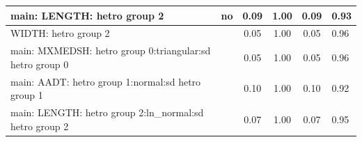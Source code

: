 \begin{table}
\begin{center}
\begin{tabular}{|l|l|c|c|c|l|}
			\hline
			main: LENGTH: hetro group 2 & no & 0.09 & 1.00 & 0.09 & 0.93 \\
			\hline
			WIDTH: hetro group 2 &  & 0.05 & 1.00 & 0.05 & 0.96 \\
			\hline
			main: MXMEDSH: hetro group 0:triangular:sd  hetro group 0 &  & 0.05 & 1.00 & 0.05 & 0.96 \\
			\hline
			main: AADT: hetro group 1:normal:sd  hetro group 1 &  & 0.10 & 1.00 & 0.10 & 0.92 \\
			\hline
			main: LENGTH: hetro group 2:ln_normal:sd  hetro group 2 &  & 0.07 & 1.00 & 0.07 & 0.95 \\
			\hline
		\end{tabular}
	\end{center}
\end{table}